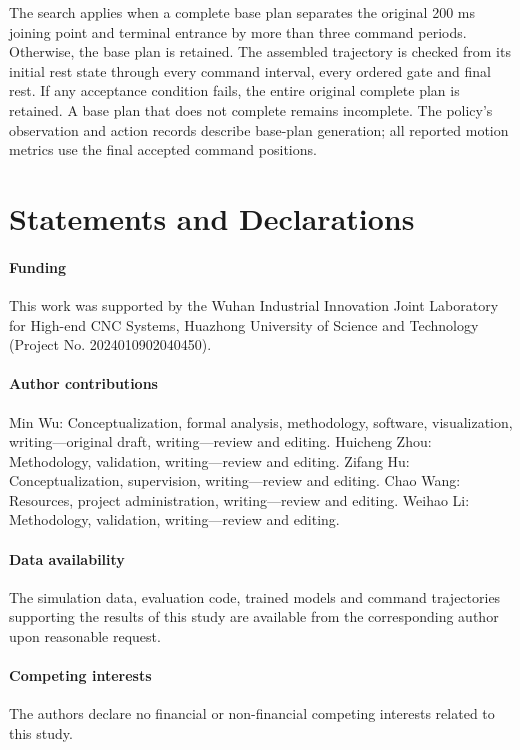 \documentclass[pdflatex,sn-apa]{sn-jnl}
\begin{document}
The search applies when a complete base plan separates the original 200 ms joining point and terminal entrance by more than three command periods. Otherwise, the base plan is retained. The assembled trajectory is checked from its initial rest state through every command interval, every ordered gate and final rest. If any acceptance condition fails, the entire original complete plan is retained. A base plan that does not complete remains incomplete. The policy's observation and action records describe base-plan generation; all reported motion metrics use the final accepted command positions.


\section*{Statements and Declarations}
\paragraph{Funding}
This work was supported by the Wuhan Industrial Innovation Joint Laboratory for High-end CNC Systems, Huazhong University of Science and Technology (Project No. 2024010902040450).
\paragraph{Author contributions}
Min Wu: Conceptualization, formal analysis, methodology, software, visualization, writing---original draft, writing---review and editing. Huicheng Zhou: Methodology, validation, writing---review and editing. Zifang Hu: Conceptualization, supervision, writing---review and editing. Chao Wang: Resources, project administration, writing---review and editing. Weihao Li: Methodology, validation, writing---review and editing.
\paragraph{Data availability}
The simulation data, evaluation code, trained models and command trajectories supporting the results of this study are available from the corresponding author upon reasonable request.
\paragraph{Competing interests}
The authors declare no financial or non-financial competing interests related to this study.

\begingroup
\setlength{\bibsep}{2pt}
\renewcommand{\bibfont}{\small}

\endgroup
\end{document}
